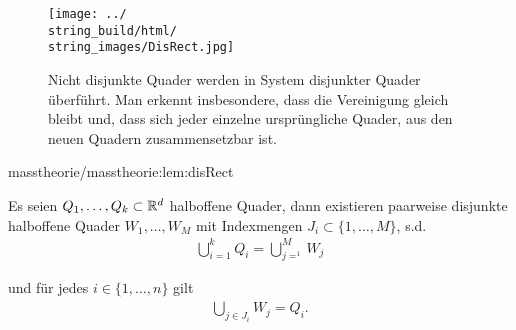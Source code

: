 \begin{figure}[htbp]
\centering


\noindent\texttt{[image: ../\\string\_build/html/\\string\_images/DisRect.jpg]}
\caption{Nicht disjunkte Quader werden in System disjunkter Quader überführt. Man erkennt insbesondere, dass die Vereinigung gleich bleibt und, dass sich jeder einzelne ursprüngliche Quader, aus den neuen Quadern zusammensetzbar ist.}\label{\detokenize{masstheorie/masstheorie:fig-disrect}}\end{figure}
\begin{lemma}{}{masstheorie/masstheorie:lem:disRect}



\par
Es seien \(Q_1,\ldots,Q_k\subset\mathbb{R}^d\) halboffene Quader, dann existieren paarweise disjunkte halboffene Quader \(W_1,\ldots, W_M\) mit Indexmengen \(J_i\subset\{1,\ldots,M\}\), s.d.
\begin{align*}
\bigcup_{i=1}^k Q_i = \bigcup_{j=^1}^M W_j
\end{align*}
\par
und für jedes \(i\in\{1,\ldots,n\}\) gilt
\begin{align*}
\bigcup_{j\in J_i} W_j = Q_i.
\end{align*}\end{lemma}

